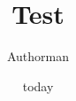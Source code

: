 \documentclass{article}
\title{Test}
\author{Authorman}
\date{today}
\begin{document}
\ExplSyntaxOn








\ExplSyntaxOff
\end{document}
